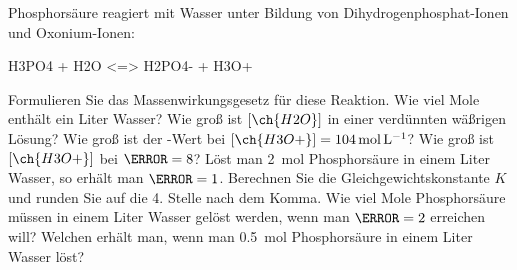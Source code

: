 \documentclass[DIV11]{scrartcl}
\begin{document}
\begin{question}[name=\pH-Wert einer schwachen Säure]
Phosphorsäure reagiert mit Wasser unter Bildung von Dihydrogenphosphat-Ionen
und Oxonium-Ionen:
\begin{reaction*}
 H3PO4 + H2O <=> H2PO4- + H3O+
\end{reaction*}
\begin{tasks}
  \task Formulieren Sie das Massenwirkungsgesetz für diese Reaktion.
  \task Wie viel Mole  enthält ein Liter Wasser?  Wie groß ist
    $[\ch{H2O}]$ in einer verdünnten wäßrigen Lösung?
  \task Wie groß ist der \pH-Wert bei $[\ch{H3O+}] =
    \SI{104}{\mole\per\liter}$?  Wie groß ist $[\ch{H3O+}]$ bei $\pH = 8$?
  \task Löst man \SI{2}{\mole} Phosphorsäure in einem Liter Wasser, so erhält
    man $\pH = 1$.  Berechnen Sie die Gleichgewichtskonstante $K$ und runden
    Sie auf die 4. Stelle nach dem Komma.
  \task Wie viel Mole Phosphorsäure müssen in einem Liter Wasser gelöst
    werden, wenn man $\pH = 2$ erreichen will?
  \task Welchen \pH{} erhält man, wenn man \SI{0.5}{\mole} Phosphorsäure in
    einem Liter Wasser löst?
\end{tasks}
\end{question}
\end{document}
